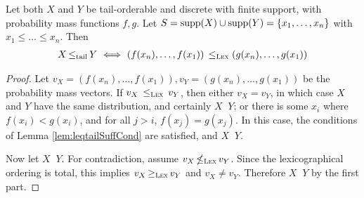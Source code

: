 \documentclass[a4paper]{scrreprt}
\DeclareMathOperator{\leqtail}{\leq_{\text{tail}}}
\DeclareMathOperator{\geqtail}{\geq_{\text{tail}}}
\DeclareMathOperator{\supp}{supp}
\DeclareMathOperator{\leqlex}{\leq_{\textsc{Lex}}}
\DeclareMathOperator{\notleqlex}{\nleq_{\textsc{Lex}}}
\DeclareMathOperator{\geqlex}{\geq_{\textsc{Lex}}}
\begin{document}
    \begin{cor}
        Let both $X$ and $Y$ be tail-orderable and discrete with finite support, with probability mass functions $f, g$. Let $S = \supp(X) \cup \supp(Y) = \set{x_1, \dots, x_n}$ with $x_1 \leq \dots \leq x_n$. Then
        \begin{gather*}
            X \leqtail Y ~\Longleftrightarrow~ (f(x_n), \dots, f(x_1)) \;\leqlex\; (g(x_n), \dots, g(x_1))
        \end{gather*}
        \label{cor:leqtailDiscreteLex}
    \end{cor}
    \begin{proof}
        Let $v_X = (f(x_n), \dots, f(x_1)), v_Y = (g(x_n), \dots, g(x_1))$ be the probability mass vectors.
        If $v_X \;\leqlex\; v_Y$, then either $v_X = v_Y$, in which case $X$ and $Y$ have the same distribution, and certainly $X \leqtail Y$; or there is some $x_i$ where $f(x_i) < g(x_i)$, and for all $j > i$, $f(x_j) = g(x_j)$. In this case, the conditions of Lemma \ref{lem:leqtailSuffCond} are satisfied, and $X \leqtail Y$.
        
        Now let $X \leqtail Y$. For contradiction, assume $v_X \notleqlex v_Y$.
        Since the lexicographical ordering is total, this implies $v_X \geqlex v_Y$ and $v_X \neq v_Y$.
        Therefore $X \geqtail Y$ by the first part.
    \end{proof}
    
\end{document}
